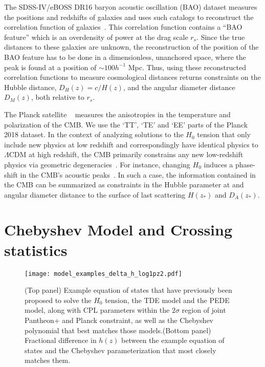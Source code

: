 \documentclass[
 reprint,
 amsmath,amssymb,
 aps,
]{revtex4-2}
\begin{document}
The SDSS-IV/eBOSS DR16 baryon acoustic oscillation (BAO) dataset measures the positions and redshifts of galaxies and uses such catalogs to reconstruct the correlation function of galaxies~\cite{eBOSS:2020yzd}. 
This correlation function contains a ``BAO feature'' which is an overdensity of power at the drag scale $r_s$. 
Since the true distances to these galaxies are unknown, the reconstruction of the position of the BAO feature has to be done in a dimensionless, unanchored space, where the peak is found at a position of $\sim 100 h^{-1}$ Mpc. Thus, using these reconstructed correlation functions to measure cosmological distances returns constraints on the Hubble distance, $D_H(z) = c/H(z)$, and the angular diameter distance $D_M(z)$, both relative to $r_s$.

The Planck satellite ~\cite{Planck:2018vyg} measures the anisotropies in the temperature and polarization of the CMB.  We use the `TT', `TE' and `EE' parts of the Planck 2018 dataset. In the context of analyzing solutions to the $H_0$ tension that only include new physics at low redshift and correspondingly have identical physics to $\Lambda$CDM at high redshift, the CMB primarily constrains any new low-redshift physics via geometric degeneracies~\cite{2019JCAP...12..035K}.  For instance, changing $H_0$ induces a phase-shift in the CMB's acoustic peaks~\cite{2020JCAP...09..055K}.  In such a case, the information contained in the CMB can be summarized as constraints in the Hubble parameter at and angular diameter distance to the surface of last scattering $H(z_*)$ and  $D_A(z_*)$.

\section{Chebyshev Model and Crossing statistics}
\begin{figure}
    \centering
    \texttt{[image: model\_examples\_delta\_h\_log1pz2.pdf]}
    \caption{(Top panel) Example equation of states that have previously been proposed to solve the $H_0$ tension, the TDE model and the PEDE model, along with CPL parameters within the $2\sigma$ region of joint Pantheon+ and Planck constraint, as well as the Chebyshev polynomial that best matches those models.(Bottom panel) Fractional difference in $h(z)$ between the example equation of states and the Chebyshev parameterization that most closely matches them.}
    \label{fig:examples}
\end{figure}
\end{document}
